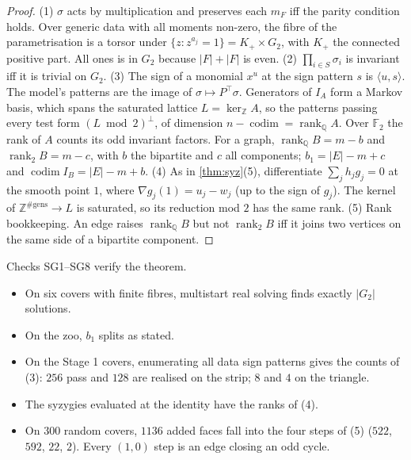 \documentclass[11pt]{article}
\theoremstyle{definition}\newtheorem{definition}[theorem]{Definition}\newtheorem{remark}[theorem]{Remark}\newtheorem{example}[theorem]{Example}
\begin{document}
\begin{proof}
(1) $\sigma$ acts by multiplication and preserves each $m_F$ iff the parity condition holds. Over generic data with all moments non-zero,
the fibre of the parametrisation is a torsor under $\{z:z^{a_j}=1\}=K_+\times G_2$, with $K_+$ the connected positive part. All ones
is in $G_2$ because $|F|+|F|$ is even. (2) $\prod_{i\in S}\sigma_i$ is invariant iff it is trivial on $G_2$. (3) The sign of a
monomial $x^u$ at the sign pattern $s$ is $\langle u,s\rangle$. The model's patterns are the image of $\sigma\mapsto P^\top\sigma$.
Generators of $I_A$ form a Markov basis, which spans the saturated lattice $L=\ker_\mathbb ZA$, so the patterns passing every test form
$(L\bmod2)^\perp$, of dimension $n-\operatorname{codim}=\operatorname{rank}_\mathbb QA$. Over $\mathbb F_2$ the rank of $A$ counts its odd
invariant factors. For a graph, $\operatorname{rank}_\mathbb QB=m-b$ and $\operatorname{rank}_2B=m-c$, with $b$ the bipartite and $c$
all components; $b_1=|E|-m+c$ and $\operatorname{codim}I_B=|E|-m+b$. (4) As in \cref{thm:syz}(5), differentiate $\sum_jh_jg_j=0$ at the
smooth point $1$, where $\nabla g_j(1)=u_j-w_j$ (up to the sign of $g_j$). The kernel of $\mathbb Z^{\#\text{gens}}\to L$ is saturated, so its
reduction mod $2$ has the same rank. (5) Rank bookkeeping. An edge raises $\operatorname{rank}_\mathbb QB$ but not $\operatorname{rank}_2B$
iff it joins two vertices on the same side of a bipartite component.
\end{proof}

Checks SG1--SG8 verify the theorem.
\begin{itemize}
\item On six covers with finite fibres, multistart real solving finds exactly $|G_2|$ solutions.
\item On the zoo, $b_1$ splits as stated.
\item On the Stage 1 covers, enumerating all data sign patterns gives the counts of (3): $256$ pass and $128$ are realised on the strip;
  $8$ and $4$ on the triangle.
\item The syzygies evaluated at the identity have the ranks of (4).
\item On $300$ random covers, $1136$ added faces fall into the four steps of (5) ($522$, $592$, $22$, $2$). Every $(1,0)$ step is an edge
  closing an odd cycle.
\end{itemize}
\end{document}
